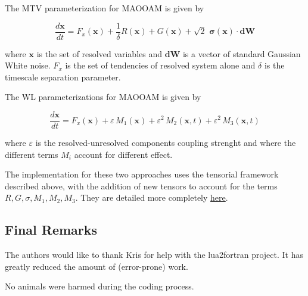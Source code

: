 The M\+TV parameterization for M\+A\+O\+O\+AM is given by

\[ \frac{d\boldsymbol{x}}{dt} = F_x(\boldsymbol{x}) + \frac{1}{\delta} R(\boldsymbol{x}) + G(\boldsymbol{x}) + \sqrt{2} \,\, \boldsymbol{\sigma}(\boldsymbol{x}) \cdot \boldsymbol{dW} \]

where $\boldsymbol{x}$ is the set of resolved variables and $\boldsymbol{dW}$ is a vector of standard Gaussian White noise. $F_x$ is the set of tendencies of resolved system alone and $\delta$ is the timescale separation parameter.

The WL parameterizations for M\+A\+O\+O\+AM is given by

\[\frac{d\boldsymbol{x}}{dt} = F_x(\boldsymbol{x}) + \varepsilon \, M_1(\boldsymbol{x}) + \varepsilon^2 \, M_2(\boldsymbol{x},t) + \varepsilon^2 \, M_3 (\boldsymbol{x},t)\]

where $\varepsilon$ is the resolved-\/unresolved components coupling strenght and where the different terms $M_i$ account for different effect.

The implementation for these two approaches uses the tensorial framework described above, with the addition of new tensors to account for the terms $R,G,\sigma,M_1,M_2,M_3$. They are detailed more completely \hyperlink{md_doc_sto_doc}{here}.





\subsection*{Final Remarks}

The authors would like to thank Kris for help with the lua2fortran project. It has greatly reduced the amount of (error-\/prone) work.

No animals were harmed during the coding process. 